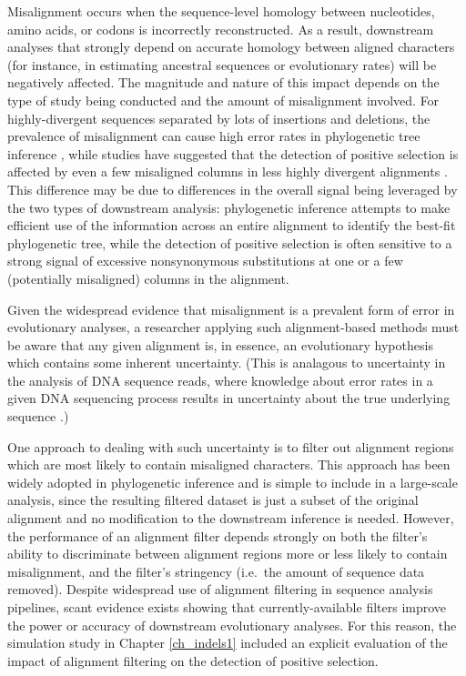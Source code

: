Misalignment occurs when the sequence-level homology between
nucleotides, amino acids, or codons is incorrectly reconstructed. As a
result, downstream analyses that strongly depend on accurate homology
between aligned characters (for instance, in estimating ancestral
sequences or evolutionary rates) will be negatively affected. The
magnitude and nature of this impact depends on the type of study being
conducted and the amount of misalignment involved. For
highly-divergent sequences separated by lots of insertions and
deletions, the prevalence of misalignment can cause high error rates
in phylogenetic tree inference \citep{Wong2008Alignment}, while studies have
suggested that the detection of positive selection is affected by even
a few misaligned columns in less highly divergent alignments
\citep{Fletcher2010}. This difference may be due to differences in the
overall signal being leveraged by the two types of downstream
analysis: phylogenetic inference attempts to make efficient use of the
information across an entire alignment to identify the best-fit
phylogenetic tree, while the detection of positive selection is often
sensitive to a strong signal of excessive nonsynonymous substitutions
at one or a few (potentially misaligned) columns in the alignment.

Given the widespread evidence that misalignment is a prevalent form of
error in evolutionary analyses, a researcher applying such
alignment-based methods must be aware that any given alignment is, in
essence, an evolutionary hypothesis which contains some inherent
uncertainty. (This is analagous to uncertainty in the analysis of DNA
sequence reads, where knowledge about error rates in a given DNA
sequencing process results in uncertainty about the true underlying
sequence \citep{Cock2010}.)

One approach to dealing with such uncertainty is to filter out
alignment regions which are most likely to contain misaligned
characters. This approach has been widely adopted in phylogenetic
inference \citep{Penn2010Alignment} and is simple to include in a large-scale
analysis, since the resulting filtered dataset is just a subset of the
original alignment and no modification to the downstream inference is
needed. However, the performance of an alignment filter depends
strongly on both the filter's ability to discriminate between
alignment regions more or less likely to contain misalignment, and the
filter's stringency (i.e.\ the amount of sequence data
removed). Despite widespread use of alignment filtering in sequence
analysis pipelines, scant evidence exists showing that
currently-available filters improve the power or accuracy of
downstream evolutionary analyses. For this reason, the simulation
study in Chapter \ref{ch_indels1} included an explicit evaluation of
the impact of alignment filtering on the detection of positive
selection.

